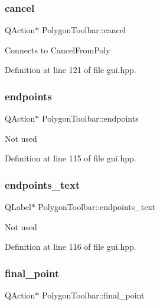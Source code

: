 \subsubsection{\texorpdfstring{cancel}{cancel}}
{\footnotesize\ttfamily Q\+Action$\ast$ Polygon\+Toolbar\+::cancel}

Connects to Cancel\+From\+Poly 

Definition at line 121 of file gui.\+hpp.

\mbox{\label{structPolygonToolbar_a78a569efc30754e02b7d8f5d74ede0ec}} 
\subsubsection{\texorpdfstring{endpoints}{endpoints}}
{\footnotesize\ttfamily Q\+Action$\ast$ Polygon\+Toolbar\+::endpoints}

Not used 

Definition at line 115 of file gui.\+hpp.

\mbox{\label{structPolygonToolbar_a4ab3ad9905d894a2f166a4e1cbfb9e3a}} 
\subsubsection{\texorpdfstring{endpoints\+\_\+text}{endpoints\_text}}
{\footnotesize\ttfamily Q\+Label$\ast$ Polygon\+Toolbar\+::endpoints\+\_\+text}

Not used 

Definition at line 116 of file gui.\+hpp.

\mbox{\label{structPolygonToolbar_a25d471a6081bfa4107d5f1cd9a61d243}} 
\subsubsection{\texorpdfstring{final\+\_\+point}{final\_point}}
{\footnotesize\ttfamily Q\+Action$\ast$ Polygon\+Toolbar\+::final\+\_\+point}

